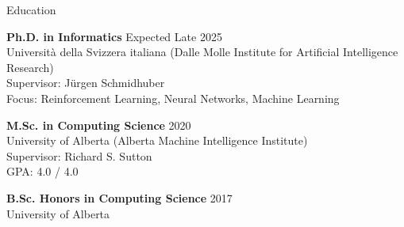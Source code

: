 \documentclass{cv}
\begin{document}

\begin{rSection}{Education}

{\bf Ph.D. in Informatics} \hfill Expected Late 2025 \vspace{0.05em}\\
Universit{\`{a}} della Svizzera italiana (Dalle Molle Institute for Artificial Intelligence Research) \vspace{0.05em}\\
Supervisor: J{\"u}rgen Schmidhuber \vspace{0.05em}\\
Focus: Reinforcement Learning, Neural Networks, Machine Learning


{\bf M.Sc. in Computing Science} \hfill 2020 \vspace{0.05em}\\
University of Alberta (Alberta Machine Intelligence Institute) \vspace{0.05em}\\
Supervisor: Richard S. Sutton \vspace{0.05em}\\
GPA: 4.0 / 4.0


{\bf B.Sc. Honors in Computing Science} \hfill 2017 \vspace{0.05em}\\
University of Alberta

\end{rSection}

\end{document}
